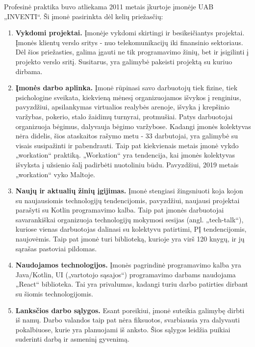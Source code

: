 Profesinė praktika buvo atliekama 2011 metais įkurtoje įmonėje UAB „INVENTI“. Ši įmonė pasirinkta dėl kelių priežasčių:

\begin{enumerate}
    \item \textbf{Vykdomi projektai.} Įmonėje vykdomi skirtingi ir besikeičiantys projektai. Įmonės klientų verslo sritys - nuo telekomunikacijų iki finansinio sektoriaus.
    Dėl šios priežasties, galima įgauti ne tik programavimo žinių, bet ir įsigilinti į projekto verslo sritį. Susitarus, yra galimybė pakeisti projektą su kuriuo dirbama.
    \item \textbf{Įmonės darbo aplinka.} Įmonė rūpinasi savo darbuotojų tiek fizine, tiek psichologine sveikata, kiekvieną mėnesį organizuojamos išvykos į renginius, pavyzdžiui,
    apsilankymas virtualios realybės arenoje, išvyka į krepšinio varžybas, pokerio, stalo žaidimų turnyrai, protmušiai. Patys darbuotojai organizuoja bėgimus, dalyvauja bėgimo
    varžybose. Kadangi įmonės kolektyvas nėra didelis, šios ataskaitos rašymo metu - 33 darbutojai, yra galimybė su visais susipažinti ir pabendrauti.
    Taip pat kiekvienais metais įmonė vykdo „workation“ praktiką. „Workation“ yra tendencija, kai įmonės kolektyvas išvyksta į užsienio šalį padirbėti nuotoliniu būdu.
    Pavyzdžiui, 2019 metais „workation“ vyko Maltoje.
    \item \textbf{Naujų ir aktualių žinių įgijimas.} Įmonė stengiasi žingsniuoti koja kojon su naujausiomis technologijų tendencijomis, pavyzdžiui, naujausi projektai parašyti su
    Kotlin programavimo kalba. Taip pat įmonės darbuotojai savarankiškai organizuoja technologijų mokymosi sesijas (angl. „tech-talk“), kuriose vienas darbuotojas dalinasi su kolektyvu
    patirtimi, PĮ tendencijomis, naujovėmis. Taip pat įmonė turi biblioteką, kurioje yra virš 120 knygų, ir jų sąrašas pastoviai pildomas.
    \item \textbf{Naudojamos technologijos.} Įmonės pagrindinė programavimo kalba yra Java/Kotlin, UI („vartotojo sąsajos“) programavimo darbams naudojama „React“ biblioteka. Tai yra privalumas,
    kadangi turiu darbo patirties dirbant su šiomis technologijomis.
    \item \textbf{Lanksčios darbo sąlygos.} Esant poreikiui, įmonė suteikia galimybę dirbti iš namų.
    Darbo valandos taip pat nėra fiksuotos, svarbiausia yra dalyvauti pokalbiuose, kurie yra planuojami iš anksto. Šios sąlygos leidžia
    puikiai suderinti darbą ir asmeninį gyvenimą.
\end{enumerate}

